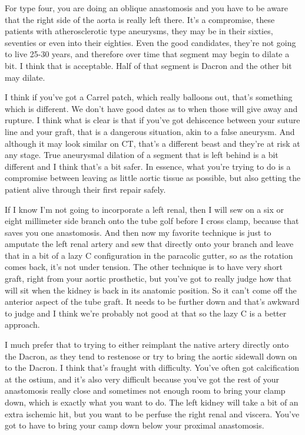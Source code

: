 \documentclass[
]{book}
\begin{document}
For type four, you are doing an oblique anastomosis and you have to be
aware that the right side of the aorta is really left there. It's a
compromise, these patients with atherosclerotic type aneurysms, they may
be in their sixties, seventies or even into their eighties. Even the
good candidates, they're not going to live 25-30 years, and therefore
over time that segment may begin to dilate a bit. I think that is
acceptable. Half of that segment is Dacron and the other bit may dilate.

I think if you've got a Carrel patch, which really balloons out, that's
something which is different. We don't have good dates as to when those
will give away and rupture. I think what is clear is that if you've got
dehiscence between your suture line and your graft, that is a dangerous
situation, akin to a false aneurysm. And although it may look similar on
CT, that's a different beast and they're at risk at any stage. True
aneurysmal dilation of a segment that is left behind is a bit different
and I think that's a bit safer. In essence, what you're trying to do is
a compromise between leaving as little aortic tissue as possible, but
also getting the patient alive through their first repair safely.

If I know I'm not going to incorporate a left renal, then I will sew on
a six or eight millimeter side branch onto the tube golf before I cross
clamp, because that saves you one anastomosis. And then now my favorite
technique is just to amputate the left renal artery and sew that
directly onto your branch and leave that in a bit of a lazy C
configuration in the paracolic gutter, so as the rotation comes back,
it's not under tension. The other technique is to have very short graft,
right from your aortic prosthetic, but you've got to really judge how
that will sit when the kidney is back in its anatomic position. So it
can't come off the anterior aspect of the tube graft. It needs to be
further down and that's awkward to judge and I think we're probably not
good at that so the lazy C is a better approach.

I much prefer that to trying to either reimplant the native artery
directly onto the Dacron, as they tend to restenose or try to bring the
aortic sidewall down on to the Dacron. I think that's fraught with
difficulty. You've often got calcification at the ostium, and it's also
very difficult because you've got the rest of your anastomosis really
close and sometimes not enough room to bring your clamp down, which is
exactly what you want to do. The left kidney will take a bit of an extra
ischemic hit, but you want to be perfuse the right renal and viscera.
You've got to have to bring your camp down below your proximal
anastomosis.
\end{document}

